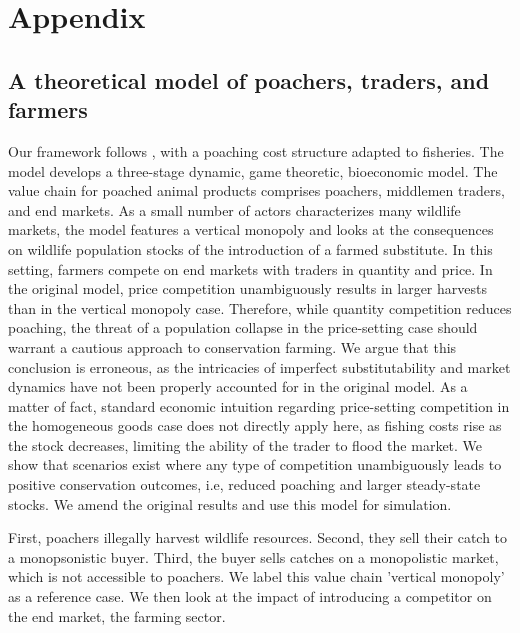 \section{Appendix}
\subsection{A theoretical model of poachers, traders, and farmers}

Our framework follows \cite{damania_economics_2007}, with a poaching cost structure adapted to fisheries. The model develops a three-stage dynamic, game theoretic, bioeconomic model. The value chain for poached animal products comprises poachers, middlemen traders, and end markets. As a small number of actors characterizes many wildlife markets, the model features a vertical monopoly and looks at the consequences on wildlife population stocks of the introduction of a farmed substitute. In this setting, farmers compete on end markets with traders in quantity and price. In the original model, price competition unambiguously results in larger harvests than in the vertical monopoly case. Therefore, while quantity competition reduces poaching, the threat of a population collapse in the price-setting case should warrant a cautious approach to conservation farming. We argue that this conclusion is erroneous, as the intricacies of imperfect substitutability and market dynamics have not been properly accounted for in the original model. As a matter of fact, standard economic intuition regarding price-setting competition in the homogeneous goods case does not directly apply here, as fishing costs rise as the stock decreases, limiting the ability of the trader to flood the market. We show that scenarios exist where any type of competition unambiguously leads to positive conservation outcomes, i.e, reduced poaching and larger steady-state stocks. We amend the original results and use this model for simulation. 

First, poachers illegally harvest wildlife resources. Second, they sell their catch to a monopsonistic buyer. Third, the buyer sells catches on a monopolistic market, which is not accessible to poachers. We label this value chain 'vertical monopoly' as a reference case. We then look at the impact of introducing a competitor on the end market, the farming sector. 
%
